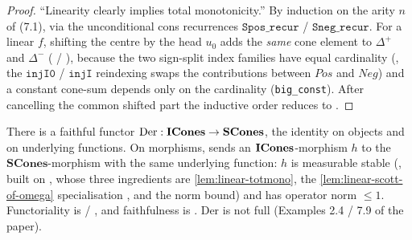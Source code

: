 \begin{proof}
``Linearity clearly implies total monotonicity.'' By induction on the
arity $n$ of (7.1), via the unconditional cons recurrences
$\texttt{Spos\_recur}$ / $\texttt{Sneg\_recur}$. For a linear $f$,
shifting the centre by the head $u_0$ adds the \emph{same} cone element
to $\Delta^+$ and $\Delta^-$
( /
), because the two
sign-split index families have equal cardinality
(, the $\texttt{injI0}$ /
$\texttt{injI}$ reindexing swaps the contributions between $\mathit{Pos}$
and $\mathit{Neg}$) and a constant cone-sum depends only on the
cardinality (\texttt{big\_const}). After cancelling the common shifted
part the inductive order reduces to
.
\end{proof}

\begin{lemma}\label{lem:ders}
\rocqok
{}
There is a faithful functor $\mathrm{Der} : \mathbf{ICones} \to \mathbf{SCones}$,
the identity on objects and on underlying functions. On morphisms,
 sends an $\mathbf{ICones}$-morphism $h$ to
the $\mathbf{SCones}$-morphism with the same underlying function: $h$ is
measurable stable (,
built on , whose three
ingredients are \autoref{lem:linear-totmono}, the
\autoref{lem:linear-scott-of-omega} specialisation
, and the norm bound)
and has operator norm $\leq 1$. Functoriality is
 /
, and faithfulness is
. $\mathrm{Der}$ is not
full (Examples 2.4 / 7.9 of the paper).
\end{lemma}

